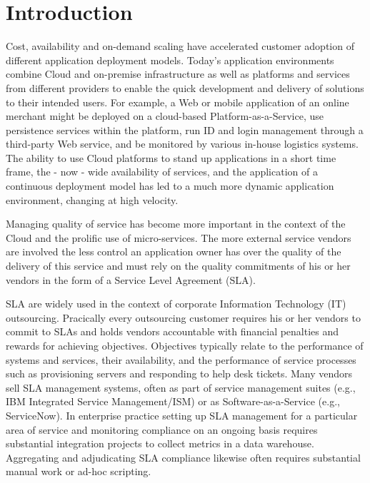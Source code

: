 \section{Introduction}\label{sec:introduction}


Cost, availability and on-demand scaling have accelerated customer adoption of different application deployment models. Today's application environments combine Cloud and on-premise infrastructure as well as platforms and services from different providers to enable the quick development and 
delivery of solutions to their intended users. For example, a Web or mobile application of an online merchant might be deployed on a cloud-based Platform-as-a-Service, use 
persistence services within the platform, run ID and login management through a third-party Web service, and be monitored by various in-house logistics systems. The ability to use 
Cloud platforms to stand up applications in a short time frame, the - now - wide availability of services, and the application of a continuous deployment model has led to a much 
more dynamic application environment, changing at high velocity.

Managing quality of service has become more important in the context of the Cloud and the prolific use of micro-services. The more external service vendors are involved the 
less control an application owner has over the quality of the delivery of this service and must rely on the quality commitments of his or her vendors in the form of a Service Level Agreement (SLA).

SLA are widely used in the context of corporate Information Technology (IT) outsourcing. Pracically every outsourcing customer requires his or her vendors to commit to SLAs and holds vendors accountable with financial penalties and rewards for achieving objectives. Objectives typically relate to the performance of systems and services, their availability, and the performance of service processes such as provisioning servers and responding to help desk tickets. Many vendors sell SLA management systems, often as part of service management suites (e.g., IBM Integrated Service Management/ISM) or as Software-as-a-Service (e.g., ServiceNow). In enterprise practice setting up SLA management for a particular area of service and monitoring compliance on an ongoing basis requires substantial integration projects to collect metrics in a data warehouse. Aggregating and adjudicating SLA compliance likewise often requires substantial manual work or ad-hoc scripting.

